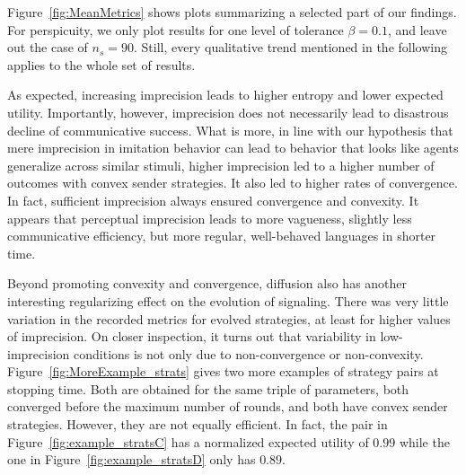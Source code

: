 \documentclass[fleqn,reqno,10pt]{article}
\begin{document}
Figure~\ref{fig:MeanMetrics} shows plots summarizing a selected part of our findings.  For
perspicuity, we only plot results for one level of tolerance $\beta = 0.1$, and leave out the
case of $n_s = 90$. Still, every qualitative trend mentioned in the following applies to the
whole set of results.

As expected, increasing imprecision leads to higher entropy and lower expected
utility. Importantly, however, imprecision does not necessarily lead to disastrous decline of
communicative success. What is more, in line with our hypothesis that mere imprecision in
imitation behavior can lead to behavior that looks like agents generalize across similar
stimuli, higher imprecision led to a higher number of outcomes with convex sender
strategies. It also led to higher rates of convergence. In fact, sufficient imprecision always
ensured convergence and convexity. It appears that perceptual imprecision leads to more
vagueness, slightly less communicative efficiency, but more regular, well-behaved languages in
shorter time.

Beyond promoting convexity and convergence, diffusion also has another interesting
regularizing effect on the evolution of signaling. There was very
little variation in the recorded metrics for evolved strategies, at
least for higher values of imprecision. On closer inspection, it turns
out that variability in low-imprecision conditions is not only due to
non-convergence or non-convexity. Figure~\ref{fig:MoreExample_strats}
gives two more examples of strategy pairs at stopping time. Both are
obtained for the same triple of parameters, both converged before the
maximum number of rounds, and both have
convex sender strategies. However, they are not equally efficient. In
fact, the pair in Figure~\ref{fig:example_stratsC} has a normalized
expected utility of $0.99$ while the one in
Figure~\ref{fig:example_stratsD} only has $0.89$.
\end{document}
